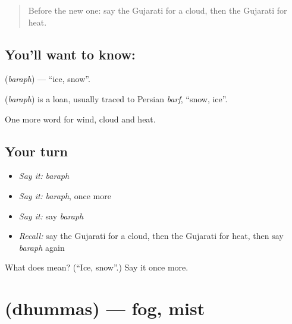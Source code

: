 \label{lesson:GU-C66-ice}



\begin{quote}
Before the new one: say the Gujarati for a cloud, then the Gujarati for heat.
\end{quote}

\subsection*{You'll want to know: }
\textbf{} (\emph{baraph}) — \textquotedblleft{}ice, snow\textquotedblright{}.

\begin{cousinweb}
\textbf{} (\emph{baraph}) is a loan, usually traced to Persian \emph{barf}, \textquotedblleft{}snow, ice\textquotedblright{}.
\end{cousinweb}

\begin{grammarlens}[title={What you've built}]
One more word for wind, cloud and heat.
\end{grammarlens}

\subsection*{Your turn}
\begin{itemize}
\raggedright
  \item \emph{Say it:} \emph{baraph}
  \item \emph{Say it:} \emph{baraph}, once more
  \item \emph{Say it:} say \emph{baraph}
  \item \emph{Recall:} say the Gujarati for a cloud, then the Gujarati for heat, then say \emph{baraph} again
\end{itemize}

\begin{tcolorbox}[breakable,colback=teal!4,colframe=teal!35!black,title={Before you move on}]
What does  mean? (\textquotedblleft{}Ice, snow\textquotedblright{}.) Say it once more.
\end{tcolorbox}
\section[\texorpdfstring{\gu{ધુમ્મસ} (dhummas)}{ધુમ્મસ (dhummas)}]{ (dhummas) — fog, mist}

\label{lesson:GU-C66-fog}



